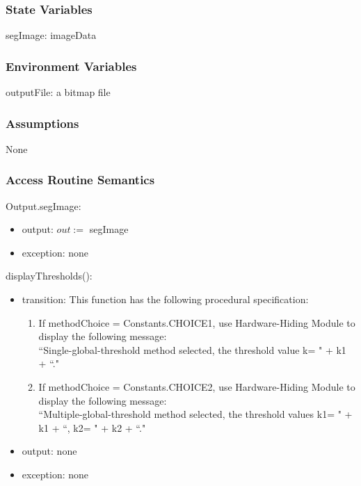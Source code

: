 \documentclass[12pt, titlepage]{article}
\begin{document}
\subsubsection{State Variables}

segImage: imageData

\subsubsection{Environment Variables}

outputFile: a bitmap file

\subsubsection{Assumptions}

None

\subsubsection{Access Routine Semantics}

\noindent Output.segImage:
\begin{itemize}
\item output: $out :=$ segImage
\item exception: none 
\end{itemize}

\noindent displayThresholds():
\begin{itemize}
\item transition:
This function has the following procedural specification:
\begin{enumerate}
    \item
If methodChoice = Constants.CHOICE1, use Hardware-Hiding Module to display the
following message:\\
``Single-global-threshold method selected, the threshold value k= " + k1 + ``."    \item
If methodChoice = Constants.CHOICE2, use Hardware-Hiding Module to display the
following message:\\
``Multiple-global-threshold method selected, the threshold values k1= " + k1 +
``, k2= " + k2 + ``."
\end{enumerate}
\item output: none
\item exception: none
\end{itemize}
\end{document}
